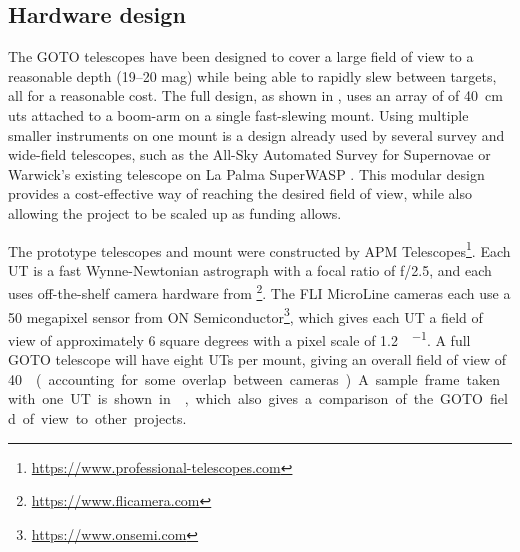 \begin{colsection}
\begin{colsection}
\end{colsection}


\subsection{Hardware design}
\label{sec:goto_design}
\begin{colsection}

The GOTO telescopes have been designed to cover a large field of view to a reasonable depth (19--20 mag) while being able to rapidly slew between targets, all for a reasonable cost. The full design, as shown in , uses an array of of \SI{40}{\cm} \glspl{ut} attached to a boom-arm on a single fast-slewing mount. Using multiple smaller instruments on one mount is a design already used by several survey and wide-field telescopes, such as the All-Sky Automated Survey for Supernovae  \citep[ASAS-SN,][]{ASAS-SN} or Warwick's existing telescope on La Palma SuperWASP  \citep{SuperWASP}. This modular design provides a cost-effective way of reaching the desired field of view, while also allowing the project to be scaled up as funding allows.

The prototype telescopes and mount were constructed by APM Telescopes\footnote{\url{https://www.professional-telescopes.com}}. Each UT is a fast Wynne-Newtonian astrograph with a focal ratio of f/2.5, and each uses off-the-shelf camera hardware from \footnote{\url{https://www.flicamera.com}}. The FLI MicroLine cameras each use a 50 megapixel sensor from ON Semiconductor\footnote{\url{https://www.onsemi.com}}, which gives each UT a field of view of approximately 6 square degrees with a pixel scale of \SI[per-mode=symbol]{1.2}{\arcsec\per\pixel}. A full GOTO telescope will have eight UTs per mount, giving an overall field of view of \SI{40}{\square\deg} (accounting for some overlap between cameras). A sample frame taken with one UT is shown in , which also gives a comparison of the GOTO field of view to other projects.


\end{colsection}
\end{colsection}
